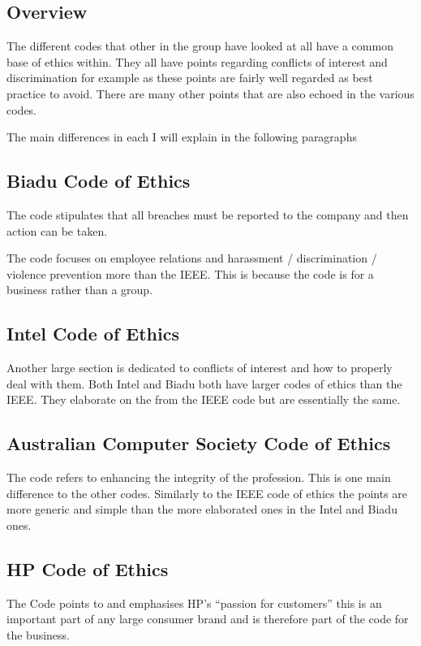 \documentclass[a4paper]{article}
\begin{document}
\subsection{Overview}

The different codes that other in the group have looked at all have a common base of ethics within. They all have points regarding conflicts of interest and discrimination for example as these points are fairly well regarded as best practice to avoid. There are many other points that are also echoed in the various codes.

The main differences in each I will explain in the following paragraphs

\subsection{Biadu  Code of Ethics}

The code stipulates that all breaches must be reported to the company and then action can be taken.

The code focuses on employee relations and harassment / discrimination / violence prevention more than the IEEE. This is because the code is for a business rather than a group. 

\subsection{Intel  Code of Ethics}

Another large section is dedicated to conflicts of interest and how to properly deal with them. 
Both Intel and Biadu both have larger codes of ethics than the IEEE. They elaborate on the from the IEEE code but are essentially the same.

\subsection{Australian Computer Society  Code of Ethics}

The code refers to enhancing the integrity of the profession. This is one main difference to the other codes. Similarly to the IEEE code of ethics the points are more generic and simple than the more elaborated ones in the Intel and Biadu ones.

\subsection{HP  Code of Ethics}

The Code points to and emphasises HP’s “passion for customers” this is an important part of any large consumer brand and is therefore part of the code for the business.
\end{document}
